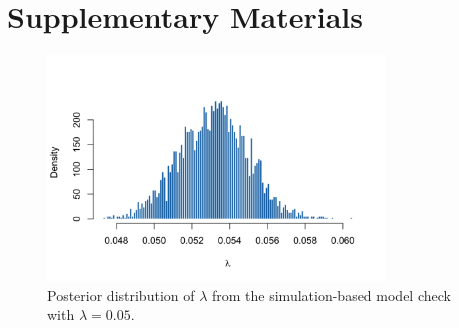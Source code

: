 \pagebreak
\section*{Supplementary Materials}

\setcounter{figure}{0}
\setcounter{table}{0}

\renewcommand{\thefigure}{S\arabic{figure}}
\renewcommand{\thetable}{S\arabic{table}}

\begin{figure}[H]
  \centering
  \includegraphics[width=0.8\textwidth]{images/simulation-based_model_check.png}
  \caption{{\small Posterior distribution of $\lambda$ from the simulation-based model check with $\lambda=0.05$.}}
  \label{fig:posterior_s1}
\end{figure}